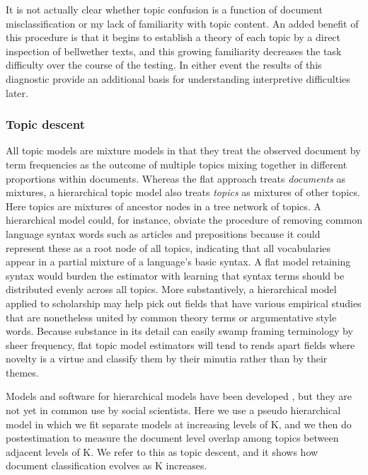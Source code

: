 \documentclass[]{book}
\theoremstyle{definition}
\theoremstyle{definition}
\theoremstyle{definition}
\theoremstyle{remark}
\begin{document}
It is not actually clear whether topic confusion is a function of
document misclassification or my lack of familiarity with topic content.
An added benefit of this procedure is that it begins to establish a
theory of each topic by a direct inspection of bellwether texts, and
this growing familiarity decreases the task difficulty over the course
of the testing. In either event the results of this diagnostic provide
an additional basis for understanding interpretive difficulties later.

\hypertarget{topic-descent}{%
\subsubsection{Topic descent}\label{topic-descent}}

All topic models are mixture models in that they treat the observed
document by term frequencies as the outcome of multiple topics mixing
together in different proportions within documents. Whereas the flat
approach treats \emph{documents} as mixtures, a hierarchical topic model
also treats \emph{topics} as mixtures of other topics. Here topics are
mixtures of ancestor nodes in a tree network of topics. A hierarchical
model could, for instance, obviate the procedure of removing common
language syntax words such as articles and prepositions because it could
represent these as a root node of all topics, indicating that all
vocabularies appear in a partial mixture of a language's basic syntax. A
flat model retaining syntax would burden the estimator with learning
that syntax terms should be distributed evenly across all topics. More
substantively, a hierarchical model applied to scholarship may help pick
out fields that have various empirical studies that are nonetheless
united by common theory terms or argumentative style words. Because
substance in its detail can easily swamp framing terminology by sheer
frequency, flat topic model estimators will tend to rends apart fields
where novelty is a virtue and classify them by their minutia rather than
by their themes.

Models and software for hierarchical models have been developed
\citep{Teh2006Hierarchical, Roberts2015pkg}, but they are not yet in
common use by social scientists. Here we use a pseudo hierarchical model
in which we fit separate models at increasing levels of K, and we then
do postestimation to measure the document level overlap among topics
between adjacent levels of K. We refer to this as topic descent, and it
shows how document classification evolves as K increases.
\end{document}

